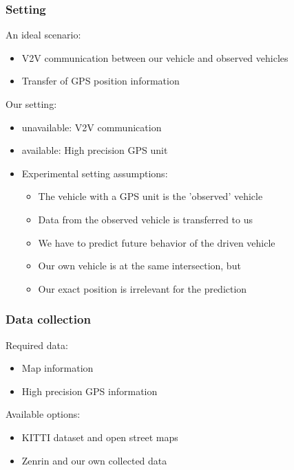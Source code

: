 \documentclass{beamer}
\begin{document}
\begin{frame}
\frametitle{Setting}
An ideal scenario:
\begin{itemize}
  \item V2V communication between our vehicle and observed vehicles
  \item Transfer of GPS position information
\end{itemize}
Our setting:
\begin{itemize}
  \item unavailable: V2V communication
  \item available: High precision GPS unit
  \item Experimental setting assumptions:
  \begin{itemize}
    \item The vehicle with a GPS unit is the 'observed' vehicle
    \item Data from the observed vehicle is transferred to us
    \item We have to predict future behavior of the driven vehicle
   	\item Our own vehicle is at the same intersection, but
   	\item Our exact position is irrelevant for the prediction
   \end{itemize}
\end{itemize}
\end{frame}

\begin{frame}
\frametitle{Data collection}
	Required data:
	\begin{itemize}
	\item Map information
	\item High precision GPS information
	\end{itemize}
	Available options:
	\begin{itemize}
	   \item KITTI dataset and open street maps
	   \item Zenrin and our own collected data 
	\end{itemize}
\end{frame}
\end{document}
